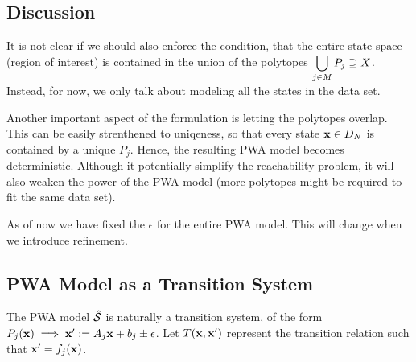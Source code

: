 \subsection{Discussion}
It is not clear if we should also enforce the condition, that the
entire state space (region of interest) is contained in the union of
the polytopes $\displaystyle\bigcup_{j\in M} P_j \supseteq X$.
Instead, for now, we only talk about modeling all the states in the
data set.

Another important aspect of the formulation is letting the polytopes
overlap. This can be easily strenthened to uniqeness, so that every
state $\mathbf{x} \in D_N$ is contained by a unique $P_j$. Hence, the
resulting PWA model becomes deterministic. Although it potentially
simplify the reachability problem, it will also weaken the power of
the PWA model (more polytopes might be required to fit the same data
set).

As of now we have fixed the $\epsilon$ for the entire PWA model. This
will change when we introduce refinement.

\subsection{PWA Model as a Transition System}
The PWA model $\hat{\mathcal{S}}$ is naturally a transition system, of the
form $P_j(\mathbf{x}) \implies \mathbf{x}' := A_j \mathbf{x} + b_j \pm \epsilon$. Let
$T(\mathbf{x},\mathbf{x}')$ represent the transition relation such that $\mathbf{x}' =
f_{j}(\mathbf{x})$.
